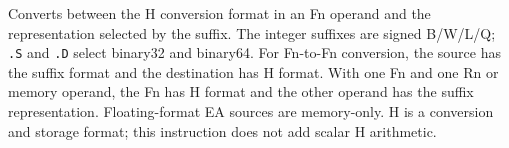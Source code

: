 Converts between the H conversion format in an Fn operand and the representation selected by the suffix. The
integer suffixes are signed B/W/L/Q; \texttt{.S} and \texttt{.D} select binary32 and binary64. For Fn-to-Fn
conversion, the source has the suffix format and the destination has H format. With one Fn and one Rn or memory
operand, the Fn has H format and the other operand has the suffix representation. Floating-format EA sources are
memory-only. H is a conversion and storage format; this instruction does not add scalar H arithmetic.
